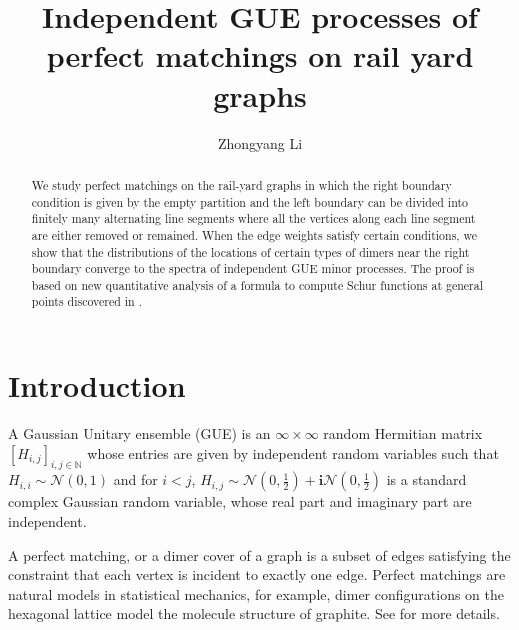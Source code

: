 \documentclass[11pt]{amsart}
\title[Independent GUE  processes of perfect matchings on rail yard graphs]{Independent GUE  processes of perfect matchings on rail yard graphs}
\date{}
\author{Zhongyang Li}
\theoremstyle{plain}
\theoremstyle{definition}
\theoremstyle{remark}
\newcommand\NN{{\mathbb N}}
\numberwithin{equation}{section}
\numberwithin{theorem}{section}
\numberwithin{figure}{section}
\begin{document}
\maketitle

\begin{abstract}We study perfect matchings on the rail-yard graphs in which the right boundary condition is given by the empty partition and the left boundary
can be divided into finitely many alternating line segments where all the vertices along
each line segment are either removed or remained.  When the edge
weights satisfy certain conditions, we show that the distributions of the locations of certain types of dimers near the right boundary converge to the spectra of independent GUE minor processes. The proof is based on new quantitative analysis of a formula to compute Schur functions at general points discovered in \cite{ZL18}.
\end{abstract}

\section{Introduction}

A Gaussian Unitary ensemble (GUE) is an $\infty\times \infty$ random Hermitian matrix $[H_{i,j}]_{i,j\in\NN}$ whose entries are given by independent random variables such that $H_{i,i}\sim \mathcal{N}(0,1)$ and for $i<j$, $H_{i,j}\sim \mathcal{N}\left(0,\frac{1}{2}\right)+\mathbf{i}\mathcal{N}\left(0,\frac{1}{2}\right)$ is a standard complex Gaussian random variable, whose real part and imaginary part are independent. %

A perfect matching, or a dimer cover of a graph is a subset of edges satisfying the constraint that each vertex is incident to exactly one edge. Perfect matchings are natural models in statistical mechanics, for example, dimer configurations on the hexagonal lattice model the molecule structure of graphite. See \cite{RK10,GV21} for more details.
\end{document}
